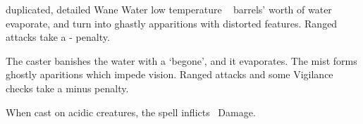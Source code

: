 
  {duplicated, detailed}%
  {Wane}%
  {Water}%
  {low temperature}%
  {\spellArea\  barrels' worth of water evaporate, and turn into ghastly apparitions with distorted features.  Ranged attacks take a - penalty.}%
  {
    The caster banishes the water with a `begone', and it evaporates.
    The mist forms ghostly aparitions which impede vision.
    Ranged attacks and some Vigilance checks take a minus  penalty.

  When cast on acidic creatures, the spell inflicts \showDam\ Damage.
    }

